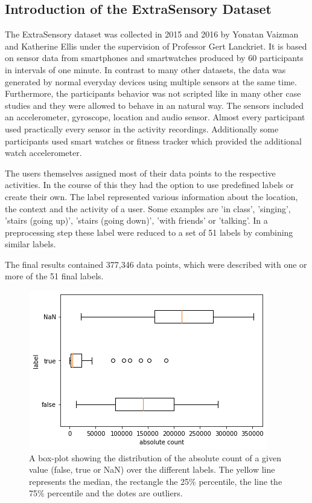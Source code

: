 \subsection{Introduction of the ExtraSensory Dataset}

The ExtraSensory dataset was collected in 2015 and 2016 by Yonatan Vaizman and Katherine Ellis under the supervision of Professor Gert Lanckriet. It is based on sensor data from smartphones and smartwatches produced by 60 participants in intervals of one minute. In contrast to many other datasets, the data was generated by normal everyday devices using multiple sensors at the same time. Furthermore, the participants behavior was not scripted like in many other case studies and they were allowed to behave in an natural way. The sensors included an accelerometer, gyroscope, location and audio sensor. Almost every participant used practically every sensor in the activity recordings. Additionally some participants used smart watches or fitness tracker which provided the additional watch accelerometer.

The users themselves assigned most of their data points to the respective activities. In the course of this they had the option to use predefined labels or create their own. The label represented various information about the location, the context and the activity of a user. Some examples are 'in class', 'singing', 'stairs (going up)', 'stairs (going down)', 'with friends' or 'talking'. In a preprocessing step these label were reduced to a set of 51 labels by combining similar labels. 

The final results contained 377,346 data points, which were described with one or more of the 51 final labels. 

\begin{figure}[H]
	\begin{center}
		\includegraphics[scale=.8]{images/boxplot_label.png}
		\caption{A box-plot showing the distribution of the absolute count of a given value (false, true or NaN) over the different labels. The yellow line represents the median, the rectangle the 25\% percentile, the line the 75\% percentile and the dotes are outliers.}
		\label{abb:boxplot_label}
	\end{center}		
\end{figure}

